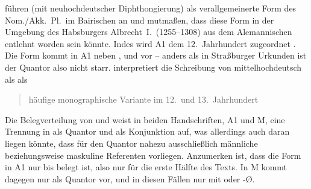 \citet[396--397]{ksw2} führen  (mit neuhochdeutscher
Diphthongierung) als ver\-all\-gemeinerte Form des Nom./Akk.\ Pl.\ im
Bairischen an und mutmaßen, dass diese Form in der Umgebung des Habsburgers
Albrecht~I.\ (1255--1308) aus dem Alemannischen entlehnt worden sein könnte.
Indes wird A1 dem 12.~Jahrhundert zugeordnet
\autocite{kcdigital,wolf:kckat}. Die Form   kommt in
A1 neben ,  und  vor -- anders als
in Straßburger Urkunden ist der Quantor also nicht starr.
\citeauthor{wiesinger2001} interpretiert die Schreibung von mittelhochdeutsch
 als  als \blockcquote[103]{wiesinger2001}{häufige
mono\-graphische Variante \textelp{} im 12.\ und 13.~Jahrhundert}.

Die Belegverteilung von  und  weist in beiden
Handschriften, A1 und M, eine Trennung in
 als Quantor und  als Konjunktion auf, was allerdings
auch daran liegen könnte, dass für den Quantor nahezu ausschließlich männliche
beziehungsweise maskuline Referenten vorliegen. Anzumerken ist, dass die Form
 in A1 nur bis  belegt ist,
also nur für die erste Hälfte des Texts. In M kommt
 dagegen nur als Quantor vor, und in diesen Fällen nur mit 
oder -Ø.




	
